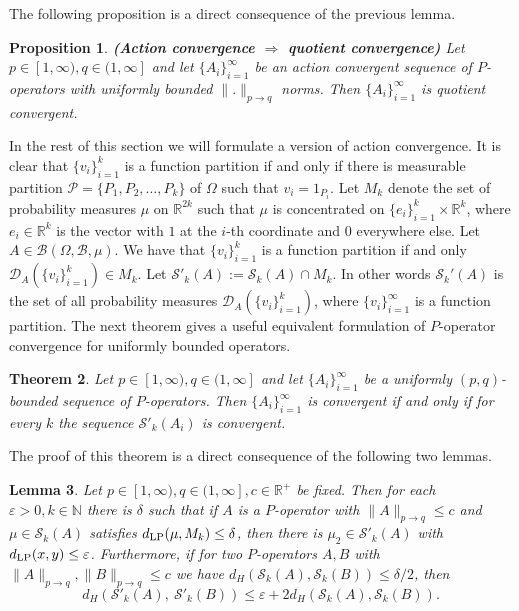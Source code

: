 \documentclass[a4wider]{amsart}
\newtheorem{theorem}{Theorem}[section]
\newtheorem{lemma}[theorem]{Lemma}
\newtheorem{proposition}[theorem]{Proposition}
\theoremstyle{definitionbreak}\newtheorem{D}[theorem]{Definition}
\theoremstyle{definitionbreak}\newtheorem*{D*}{Definition}
\begin{document}
The following proposition is a direct consequence of the previous lemma.

\begin{proposition}\label{quprop}{\bf (Action convergence $\Rightarrow$ quotient convergence)} Let $p\in [1,\infty),q\in (1,\infty]$ and let $\{A_i\}_{i=1}^\infty$ be an action convergent sequence of  $P$-operators with uniformly bounded $\|.\|_{p\to q}$ norms. Then $\{A_i\}_{i=1}^\infty$ is quotient convergent. 
\end{proposition}


In the rest of this section we will formulate a version of action convergence. It is clear that $\{v_i\}_{i=1}^k$ is a function partition if and only if there is measurable partition $\mathcal{P}=\{P_1,P_2,\dots,P_k\}$ of $\Omega$ such that $v_i=1_{P_i}$. Let $M_k$ denote the set of probability measures $\mu$ on $\mathbb{R}^{2k}$ such that $\mu$ is concentrated on $\{e_i\}_{i=1}^k\times\mathbb{R}^k$, where $e_i\in\mathbb{R}^k$ is the vector with $1$ at the $i$-th coordinate and $0$ everywhere else. Let $A\in\mathcal{B}(\Omega,\mathcal{B},\mu)$. We have that $\{v_i\}_{i=1}^k$ is a function partition if and only $\mathcal{D}_A(\{v_i\}_{i=1}^k)\in M_k$. Let $\mathcal{S}'_k(A):=\mathcal{S}_k(A)\cap M_k$. In other words $\mathcal{S}_k'(A)$ is the set of all probability measures $\mathcal{D}_A(\{v_i\}_{i=1}^k)$, where $\{v_i\}_{i=1}^\infty$ is a function partition.
The next theorem gives a useful equivalent formulation of $P$-operator convergence for uniformly bounded operators.

\begin{theorem}\label{partthm} Let $p\in [1,\infty),q\in (1,\infty]$ and let $\{A_i\}_{i=1}^\infty$ be a uniformly $(p,q)$-bounded sequence of $P$-operators. Then $\{A_i\}_{i=1}^\infty$ is convergent if and only if for every $k$ the sequence $\mathcal{S}'_k(A_i)$ is convergent.
\end{theorem}

The proof of this theorem is a direct consequence of the following two lemmas.

\begin{lemma}\label{partlem} Let $p\in [1,\infty),q\in (1,\infty], c\in\mathbb{R}^+$ be fixed. Then for each $\varepsilon>0,k\in\mathbb{N}$ there is $\delta$ such that if $A$ is a  $P$-operator with $\|A\|_{p\to q}\leq c$ and $\mu\in\mathcal{S}_k(A)$ satisfies $d_{\rm LP}(\mu,M_k)\leq\delta$, then there is $\mu_2\in\mathcal{S}'_k(A)$ with $d_{\rm LP}(x,y)\leq\varepsilon$. Furthermore, if for two $P$-operators $A,B$ with $\|A\|_{p\to q},\|B\|_{p\to q}\leq c$ we have $d_H(\mathcal{S}_k(A),\mathcal{S}_k(B))\leq\delta/2$, then $$d_H(\mathcal{S}'_k(A),~\mathcal{S}'_k(B))\leq\varepsilon+2d_H(\mathcal{S}_k(A),\mathcal{S}_k(B)).$$
\end{lemma}
\end{document}
